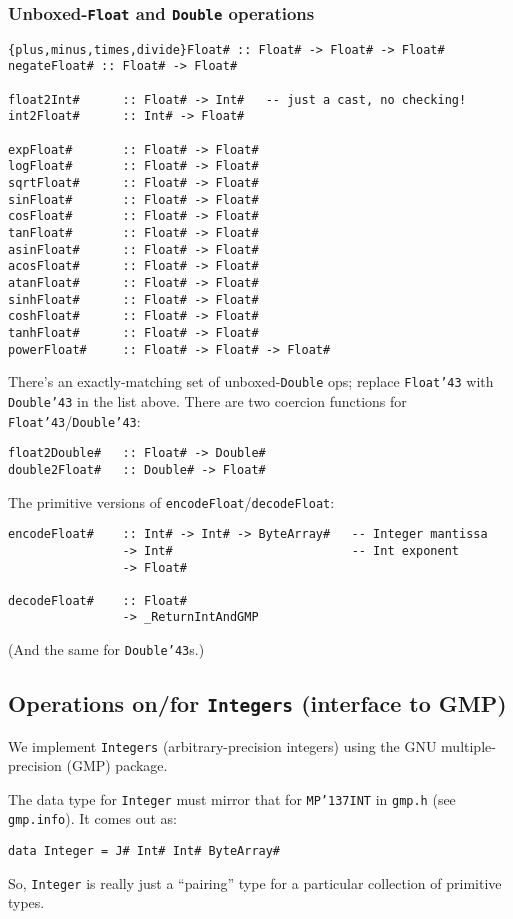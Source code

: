 \subsubsection{Unboxed-\mbox{\tt Float} and \mbox{\tt Double} operations}
\begin{verbatim}
{plus,minus,times,divide}Float# :: Float# -> Float# -> Float#
negateFloat# :: Float# -> Float#

float2Int#      :: Float# -> Int#   -- just a cast, no checking!
int2Float#      :: Int# -> Float#

expFloat#       :: Float# -> Float#
logFloat#       :: Float# -> Float#
sqrtFloat#      :: Float# -> Float#
sinFloat#       :: Float# -> Float#
cosFloat#       :: Float# -> Float#
tanFloat#       :: Float# -> Float#
asinFloat#      :: Float# -> Float#
acosFloat#      :: Float# -> Float#
atanFloat#      :: Float# -> Float#
sinhFloat#      :: Float# -> Float#
coshFloat#      :: Float# -> Float#
tanhFloat#      :: Float# -> Float#
powerFloat#     :: Float# -> Float# -> Float#
\end{verbatim}
There's an exactly-matching set of unboxed-\mbox{\tt Double} ops; replace
\mbox{\tt Float{\char'43}} with \mbox{\tt Double{\char'43}} in the list above.  There are two
coercion functions for \mbox{\tt Float{\char'43}}/\mbox{\tt Double{\char'43}}:
\begin{verbatim}
float2Double#   :: Float# -> Double#
double2Float#   :: Double# -> Float#
\end{verbatim}
The primitive versions of \mbox{\tt encodeFloat}/\mbox{\tt decodeFloat}:
\begin{verbatim}
encodeFloat#    :: Int# -> Int# -> ByteArray#   -- Integer mantissa
                -> Int#                         -- Int exponent
                -> Float#

decodeFloat#    :: Float#
                -> _ReturnIntAndGMP
\end{verbatim}
(And the same for \mbox{\tt Double{\char'43}}s.)

\subsection{Operations on/for \mbox{\tt Integers} (interface to GMP)}
\label{sect:horrid-Integer-pairing-types}

We implement \mbox{\tt Integers} (arbitrary-precision integers) using the GNU
multiple-precision (GMP) package.

The data type for \mbox{\tt Integer} must mirror that for \mbox{\tt MP{\char'137}INT} in \mbox{\tt gmp.h}
(see \mbox{\tt gmp.info}).  It comes out as:
\begin{verbatim}
data Integer = J# Int# Int# ByteArray#
\end{verbatim}
So, \mbox{\tt Integer} is really just a ``pairing'' type for a particular
collection of primitive types.

